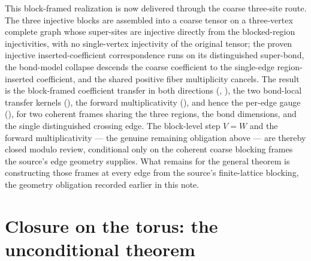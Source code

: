 \documentclass{article}
\begin{document}
This block-framed realization is now delivered through the coarse three-site route.
The three injective blocks are assembled into a coarse tensor on a three-vertex
complete graph whose super-sites are injective directly from the blocked-region
injectivities, with no single-vertex injectivity of the original tensor; the proven
injective inserted-coefficient correspondence runs on its distinguished super-bond,
the bond-model collapse descends the coarse coefficient to the single-edge
region-inserted coefficient, and the shared positive fiber multiplicity cancels. The
result is the block-framed coefficient transfer in both directions
(,
), the two bond-local transfer
kernels (), the forward
multiplicativity (), and hence the per-edge gauge
(), for two coherent frames sharing
the three regions, the bond dimensions, and the single distinguished crossing edge.
The block-level step $V=W$ and the forward multiplicativity --- the genuine remaining
obligation above --- are thereby closed modulo review, conditional only on the
coherent coarse blocking frames the source's edge geometry supplies. What remains for
the general theorem is constructing those frames at every edge from the source's
finite-lattice blocking, the geometry obligation recorded earlier in this note.

\section*{Closure on the torus: the unconditional theorem}
\end{document}
